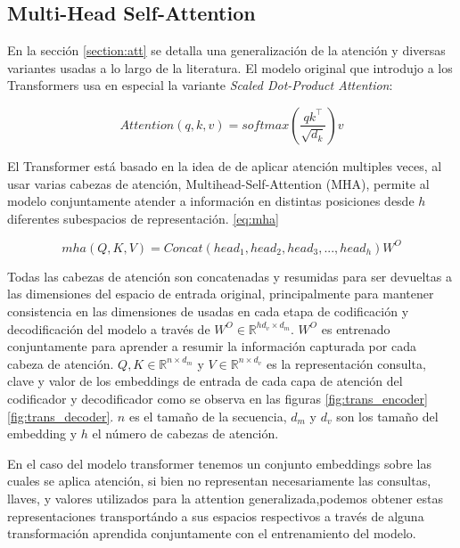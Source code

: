 \subsection{Multi-Head Self-Attention}

En la sección \ref{section:att} se detalla una generalización de la atención y diversas variantes usadas
a lo largo de la literatura. El modelo original que introdujo a los Transformers usa en especial la variante
\textit{Scaled Dot-Product Attention}\cite{Vaswani}:

\begin{equation}
    Attention(q, k, v) = softmax(\frac{q k^\top}{\sqrt{d_k}}) v
    \label{eq:trans_att_gen}
\end{equation}

El Transformer está basado en la idea de de aplicar atención multiples veces, al usar varias cabezas
de atención, Multihead-Self-Attention (MHA), permite  al modelo conjuntamente atender a información
en distintas posiciones desde $h$ diferentes subespacios de representación. \ref{eq:mha}

\begin{equation}
    mha(Q, K, V) = Concat(head_1,head_2,head_3,..., head_h)W^O
    \label{eq:mha}
\end{equation}

Todas las cabezas de atención son concatenadas y resumidas para ser devueltas a las dimensiones del
espacio de entrada original, principalmente para mantener consistencia en las dimensiones de usadas
en cada etapa de codificación y decodificación del modelo a través de $W^O \in \mathbb{R}^{hd_v \times d_m}$.
$W^O$ es entrenado conjuntamente para aprender a resumir la información capturada por cada cabeza de
atención. $Q, K \in \mathbb{R}^{n \times d_{m}}$ y $V \in \mathbb{R}^{n \times d_{v}}$ es la representación
consulta, clave y valor de los embeddings de entrada de cada capa de atención del codificador y
decodificador como se observa en las figuras \ref{fig:trans_encoder} \ref{fig:trans_decoder}.
$n$ es el tamaño de la secuencia, $d_m$ y $d_v$ son los tamaño del embedding y $h$ el número de
cabezas de atención.

En el caso del modelo transformer tenemos un conjunto embeddings sobre las cuales se aplica atención,
si bien no representan necesariamente las consultas, llaves, y valores utilizados para la attention
generalizada,podemos obtener estas representaciones transportándo a sus espacios respectivos a través de alguna
transformación aprendida conjuntamente con el entrenamiento del modelo.

